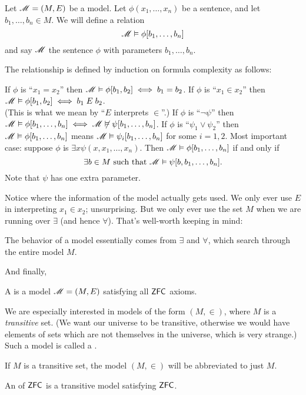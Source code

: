 \begin{definition}
	Let $\mathscr M=(M,E)$ be a model.
	Let $\phi(x_1, \dots, x_n)$ be a sentence, and let $b_1, \dots, b_n \in M$.
	We will define a relation
	\[ \mathscr M \vDash \phi[b_1, \dots, b_n] \]
	and say $\mathscr M$  the sentence $\phi$ with parameters $b_1, \dots, b_n$.

	The relationship is defined by induction on formula complexity as follows:
	\begin{itemize}
		\ii If $\phi$ is ``$x_1=x_2$'' then $\mathscr M \vDash \phi[b_1, b_2] \iff b_1 = b_2$.
		\ii If $\phi$ is ``$x_1\in x_2$'' then $\mathscr M \vDash \phi[b_1, b_2] \iff b_1 \; E \; b_2$. \\
		(This is what we mean by ``$E$ interprets $\in$''.)
		\ii If $\phi$ is ``$\neg \psi$'' then
		$\mathscr M \vDash \phi[b_1, \dots, b_n] \iff \mathscr M \not\vDash \psi[b_1, \dots, b_n]$.
		\ii If $\phi$ is ``$\psi_1 \lor \psi_2$'' then $\mathscr M \vDash \phi[b_1, \dots, b_n]$
		means $\mathscr M \vDash \psi_i[b_1, \dots, b_n]$ for some $i=1,2$.
		\ii Most important case: suppose $\phi$ is $\exists x \psi(x,x_1, \dots, x_n)$.
		Then $\mathscr M \vDash \phi[b_1, \dots, b_n]$ if and only if
		\[ \exists b \in M \text{ such that } \mathscr M \vDash \psi[b, b_1, \dots, b_n]. \]
		Note that $\psi$ has one extra parameter.
	\end{itemize}
\end{definition}
Notice where the information of the model actually gets used.
We only ever use $E$ in interpreting $x_1 \in x_2$; unsurprising.
But we only ever use the set $M$ when we are running over $\exists$ (and hence $\forall$).
That's well-worth keeping in mind:
\begin{moral}
	The behavior of a model essentially comes from $\exists$ and $\forall$,
	which search through the entire model $M$.
\end{moral}

And finally,
\begin{definition}
	A  is a model $\mathscr M = (M,E)$ satisfying all $\mathsf{ZFC}$ axioms.
\end{definition}

We are especially interested in models of the form $(M, \in)$, where $M$ is a \emph{transitive} set.
(We want our universe to be transitive,
otherwise we would have elements of sets which are not themselves
in the universe, which is very strange.)
Such a model is called a .
\begin{abuse}
	If $M$ is a transitive set, the model $(M, \in)$ will be abbreviated to just $M$.
\end{abuse}
\begin{definition}
	An  of $\mathsf{ZFC}$ is a transitive model satisfying $\mathsf{ZFC}$.
\end{definition}

